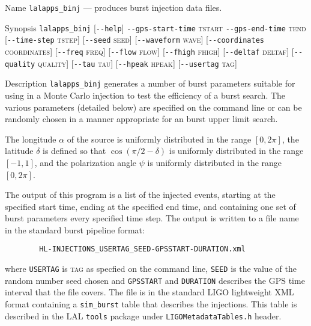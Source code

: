 \begin{entry}
\item[Name]
\verb$lalapps_binj$ --- produces burst injection data files.

\item[Synopsis]
\verb$lalapps_binj$ 
[\verb$--help$]
\verb$--gps-start-time$ \textsc{tstart} 
\verb$--gps-end-time$ \textsc{tend} 
[\verb$--time-step$ \textsc{tstep}]
[\verb$--seed$ \textsc{seed}]
[\verb$--waveform$ \textsc{wave}]
[\verb$--coordinates$ \textsc{coordinates}]
[\verb$--freq$ \textsc{freq}]
[\verb$--flow$ \textsc{flow}]
[\verb$--fhigh$ \textsc{fhigh}]
[\verb$--deltaf$ \textsc{deltaf}]
[\verb$--quality$ \textsc{quality}]
[\verb$--tau$ \textsc{tau}]
[\verb$--hpeak$ \textsc{hpeak}]
[\verb$--usertag$ \textsc{tag}]

\item[Description] 
\verb$lalapps_binj$
generates a number of burst  parameters suitable  for using in a Monte
Carlo injection to test the efficiency of a burst search.  The  various
parameters (detailed  below)  are specified on the command line or can be
randomly chosen in a manner appropriate for an burst upper limit
search.

The longitude $\alpha$ of the source is uniformly distributed in the
range $[0,2\pi]$, the latitude $\delta$ is defined so that $\cos(\pi/2 - 
\delta)$ is uniformly distributed in the range $[-1,1]$,  and the 
polarization angle $\psi$  is uniformly distributed in the
range $[0,2\pi]$.

The output of this program  is  a  list  of  the  injected events,  starting
at  the specified start time, ending at the specified end time, and containing
one set  of burst parameters every specified time step.  The output
is written to a file name in the standard burst pipeline format:
\begin{center}
\begin{verbatim}
        HL-INJECTIONS_USERTAG_SEED-GPSSTART-DURATION.xml
\end{verbatim}
\end{center}
where \verb$USERTAG$ is \textsc{tag} as specfied on the command line, 
\verb$SEED$ is the  value  of  the random number seed chosen and 
\verb$GPSSTART$ and \verb$DURATION$ describes the GPS time interval that
the file covers. The file is in the standard LIGO lightweight XML format
containing a \texttt{sim\_burst} table that describes the injections.
This table is described in the LAL \texttt{tools} package under
\texttt{LIGOMetadataTables.h} header.  


\end{entry}
